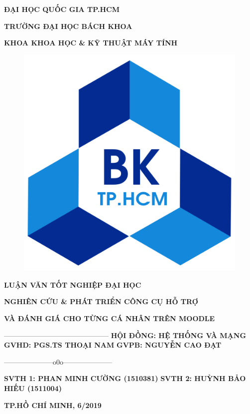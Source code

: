 
\begin{titlepage}
	\centerline{\fontsize{15}{15}\bf ĐẠI HỌC QUỐC GIA TP.HCM}
	\centerline{\fontsize{15}{15}\bf TRƯỜNG ĐẠI HỌC BÁCH KHOA}
	\centerline{\fontsize{15}{15}\bf KHOA KHOA HỌC \& KỸ THUẬT MÁY TÍNH}
	\begin{center}
		\begin{figure}[htp]
			\begin{center}
				\includegraphics[scale=0.1]{img/logo}
			\end{center}
		\end{figure}
	\end{center}
	\centerline{\fontsize{15}{15}\bf LUẬN VĂN TỐT NGHIỆP ĐẠI HỌC}
	\vspace*{2cm}
	\centerline{\Large\bf NGHIÊN CỨU \& PHÁT TRIỂN CÔNG CỤ HỖ TRỢ}
	\vspace*{0.5cm}
	\centerline{\Large\bf VÀ ĐÁNH GIÁ CHO TỪNG CÁ NHÂN TRÊN MOODLE}
	\vskip 0.5cm
	\hskip 4.9cm {———————————————}
	\vskip 1.5cm
	\hskip3cm{\fontsize{15}{15}\bf HỘI ĐỒNG: HỆ THỐNG VÀ MẠNG}
	\vskip 0.5cm
	\hskip3cm{\fontsize{15}{15}\bf GVHD: PGS.TS THOẠI NAM}
	\vskip 0.5cm
	\hskip3cm{\fontsize{15}{15}\bf GVPB: NGUYỄN CAO ĐẠT}
	\vskip 0.5cm
	\centerline{———————o0o———————}
	\vskip 0.5cm
	\hskip3cm{\fontsize{15}{15}\bf SVTH 1: PHAN MINH CƯỜNG (1510381)}
	\vskip 0.5cm
	\hskip3cm{\fontsize{15}{15}\bf SVTH 2: HUỲNH BẢO HIẾU (1511004)}
	\vfill
	\centerline{\bf TP.HỒ CHÍ MINH, 6/2019}
\end{titlepage}